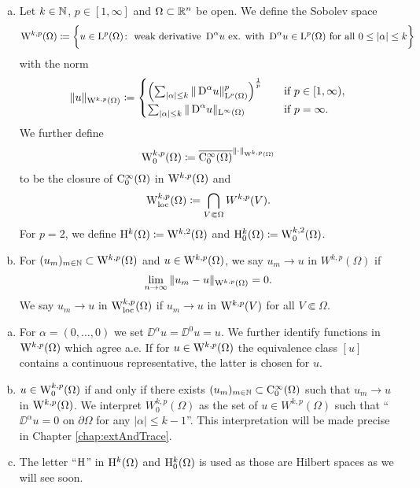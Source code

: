\begin{defn}
  \label{defn:sobolevSpace}
  \begin{enumerate}[a)]
    \item Let $k \in \mathbb{N}$, $p \in [1,\infty]$ and $\Omega \subset \mathbb{R}^n$ be open. 
      We define the Sobolev space
      $$
      \mathrm{W}^{k,p}(\Omega) \coloneqq \bigg\{u \in \mathrm{L}^p(\Omega) \colon \text{ weak derivative } \,{\operatorname{D}}^\alpha u \text{ ex. with } \,{\operatorname{D}}^\alpha u \in \mathrm{L}^p(\Omega) \text{ for all } 0 \leq |\alpha| \leq k \bigg\}
      $$
      with the norm
      $$
      \|u\|_{\mathrm{W}^{k,p}(\Omega)} \coloneqq 
      \begin{cases}
        \left( \sum_{|\alpha| \leq k} \|\,{\operatorname{D}}^\alpha u\|_{\mathrm{L}^p(\Omega)}^p \right)^{\frac{1}{p}} &\quad\text{if } p \in [1,\infty), \\
          \sum_{|\alpha| \leq k} \|\,{\operatorname{D}}^\alpha u\|_{\mathrm{L}^\infty(\Omega)} &\quad\text{if } p = \infty.
      \end{cases}
      $$
      We further define
      $$
      \mathrm{W}_0^{k,p}(\Omega) \coloneqq \overline{\mathrm{C}_0^\infty(\Omega)}^{\|\cdot\|_{\mathrm{W}^{k,p}(\Omega)}}
      $$
      to be the closure of $\mathrm{C}_0^\infty(\Omega)$ in $\mathrm{W}^{k,p}(\Omega)$ and
      $$
      \mathrm{W}_{\operatorname{loc}}^{k,p}(\Omega) \coloneqq \bigcap_{V \Subset \Omega} W^{k,p}(V).
      $$
      For $p = 2$, we define $\mathrm{H}^k(\Omega) \coloneqq \mathrm{W}^{k,2}(\Omega)$ and $\mathrm{H}_0^k(\Omega) \coloneqq \mathrm{W}_0^{k,2}(\Omega)$.
    \item For $(u_m)_{m \in \mathbb{N}} \subset \mathrm{W}^{k,p}(\Omega)$ and $u \in \mathrm{W}^{k,p}(\Omega)$, we say $u_m \to u$ in $W^{k,p}(\Omega)$ if $$\lim_{n \to \infty} \|u_m - u\|_{\mathrm{W}^{k,p}(\Omega)} = 0.$$  
      We say $u_m \to u$ in $\mathrm{W}_{\operatorname{loc}}^{k,p}(\Omega)$ if $u_m \to u$ in $\mathrm{W}^{k,p}(V)$ for all $V \Subset \Omega$.
  \end{enumerate}
\end{defn}

\begin{rem}
  \begin{enumerate}[a)]
    \item For $\alpha = (0,\dots,0)$ we set $\DD^\alpha u = \DD^0 u = u$.
      We further identify functions in $\mathrm{W}^{k,p}(\Omega)$ which agree a.e.
      If for $u \in \mathrm{W}^{k,p}(\Omega)$ the equivalence class $[u]$ contains a continuous representative, the latter is chosen for $u$.
    \item $u \in \mathrm{W}_0^{k,p}(\Omega)$ if and only if there exists $(u_m)_{m \in \mathbb{N}} \subset \mathrm{C}_0^\infty(\Omega)$ such that $u_m \to u$ in $\mathrm{W}^{k,p}(\Omega)$.
      We interpret $W_0^{k,p}(\Omega)$ as the set of $u \in W^{k,p}(\Omega)$ such that ``$\DD^\alpha u = 0$ on $\partial \Omega$ for any $|\alpha| \leq k - 1$''.
      This interpretation will be made precise in Chapter \ref{chap:extAndTrace}.
    \item The letter ``$\mathrm{H}$'' in $\mathrm{H}^k(\Omega)$ and $\mathrm{H}_0^k(\Omega)$ is used as those are Hilbert spaces as we will see soon.
  \end{enumerate}
\end{rem}


